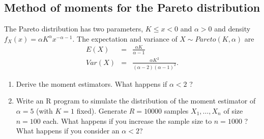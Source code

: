 \documentclass{article}
\begin{document}
\subsection{Method of moments for the Pareto distribution}

The Pareto distribution has two parameters, $K\leq x<0$ and $\alpha >0$ and
density $f_{X}(x)=\alpha K^{\alpha }x^{-\alpha -1}$. The expectation and
variance of $X\sim Pareto(K,\alpha )$ are%
\begin{eqnarray*}
E(X) &=&\frac{\alpha K}{\alpha -1} \\
Var(X) &=&\frac{\alpha K^{2}}{\left( \alpha -2\right) \left( \alpha
-1\right) ^{2}}.
\end{eqnarray*}%
$\allowbreak $

\begin{enumerate}
\item Derive the moment estimators. What happens if $\alpha <2$ ?

\item Write an R program to simulate the distribution of the moment
estimator of $\alpha =5$ (with $K=1$ fixed). Generate $R=10000$ samples $%
X_{1},\ldots ,X_{n}$ of size $n=100$ each. What happens if you increase the
sample size to $n=1000$ ? What happens if you consider an $\alpha < 2$?
\end{enumerate}
\end{document}
